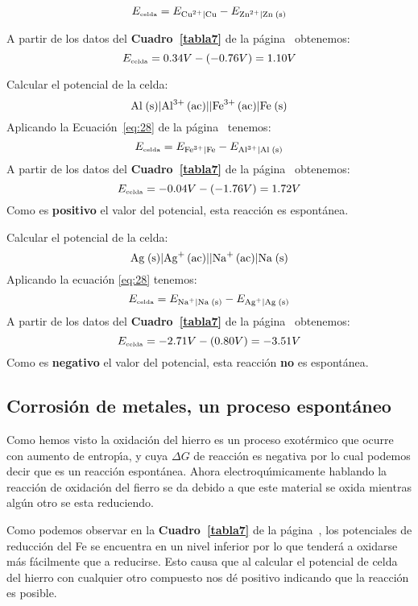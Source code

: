 $$E_{\textrm{\tiny celda}} = E_{\ce{Cu^2+}|\ce{Cu}}-E_{\ce{Zn^2+}|\ce{Zn (s)}}$$

A partir de los datos del \textbf{Cuadro~\ref{tabla7}} de la p\'agina~\pageref{tabla7} obtenemos:
$$E_{\textrm{\tiny celda}} = 0.34  V - (-0.76 V) =  1.10 V$$
\begin{example}
Calcular el potencial de la celda:
$$\ce{Al (s)}|\ce{Al^3+ (ac)}||\ce{Fe^3+ (ac)}| \ce{Fe (s)}$$
Aplicando la Ecuaci\'on~\ref{eq:28} de la p\'agina~\pageref{eq:28} tenemos:
$$E_{\textrm{\tiny celda}} = E_{\ce{Fe^3+}|\ce{Fe}}-E_{\ce{Al^3+}|\ce{Al (s)}}$$
A partir de los datos del \textbf{Cuadro~\ref{tabla7}} de la p\'agina~\pageref{tabla7} obtenemos:
$$E_{\textrm{\tiny celda}} = -0.04  V - (-1.76 V) =  1.72 V$$
Como es \textbf{positivo} el valor del potencial, esta reacci\'on es
espont\'anea.
\end{example}
\begin{example}
Calcular el potencial de la celda:
$$\ce{Ag (s)}| \ce{Ag+ (ac)}|| \ce{Na+ (ac)}| \ce{Na (s)}$$
Aplicando la ecuaci\'on \ref{eq:28} tenemos:
$$E_{\textrm{\tiny celda}} =E_{\ce{Na+}|\ce{Na (s)}}- E_{\ce{Ag+}|\ce{Ag (s)}}$$
A partir de los datos del \textbf{Cuadro~\ref{tabla7}} de la p\'agina~\pageref{tabla7} obtenemos:
$$E_{\textrm{\tiny celda}} = -2.71  V - (0.80 V) = -3.51 V$$
Como es \textbf{negativo} el valor del potencial, esta reacci\'on \textbf{no} es espont\'anea.
\end{example}


\subsection[Corrosi\'on de metales]{Corrosi\'on de metales, un proceso espont\'aneo}
Como hemos visto la oxidaci\'on del hierro es un proceso exot\'ermico que ocurre con aumento de entrop\'{\i}a, y cuya $\Delta G$ de reacci\'on es negativa por lo cual podemos decir que es un  reacci\'on espont\'anea. Ahora electroqu\'{\i}mica\-men\-te hablando la reacci\'on de oxidaci\'on del fierro se da debido a que este material se oxida mientras alg\'un otro se esta reduciendo. 

Como podemos observar en la \textbf{Cuadro~\ref{tabla7}} de la p\'agina~\pageref{tabla7}, los potenciales de reducci\'on del Fe se encuentra en un nivel inferior por lo que tender\'a a oxidarse m\'as f\'acilmente que a reducirse. Esto causa que al calcular el potencial de celda del hierro con cualquier otro compuesto nos d\'e positivo indicando que la reacci\'on es posible.

